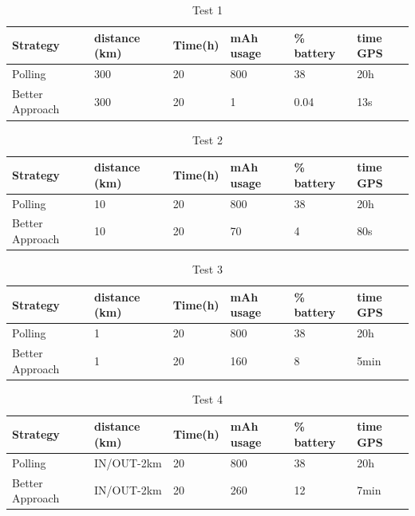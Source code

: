 \documentclass[conference]{IEEEtran}
\begin{document}
\begin{table}[h]
  \centering
    \begin{tabular}{|P{1.4cm}|P{0.8cm}|P{0.8cm}|P{0.8cm}|P{0.8cm}|P{0.8cm}|}
    \hline
    Strategy & distance (km) & Time(h) & mAh usage & \% battery & time GPS \\ \hline
    Polling & 300 & 20 & 800 & 38 & 20h   \\ \hline
    Better Approach & 300 & 20 & 1 & 0.04 & 13s   \\ \hline
   \end{tabular}
  \newline\newline
  \caption{Test 1}
\end{table}

\begin{table}[h]
  \centering
    \begin{tabular}{|P{1.4cm}|P{0.8cm}|P{0.8cm}|P{0.8cm}|P{0.8cm}|P{0.8cm}|}
    \hline
    Strategy & distance (km) & Time(h) & mAh usage & \% battery & time GPS \\ \hline
    Polling & 10 & 20 & 800 & 38 & 20h   \\ \hline
    Better Approach & 10 & 20 & 70 & 4 & 80s   \\ \hline
   \end{tabular}
  \newline\newline
  \caption{Test 2}
\end{table}

\begin{table}[h]
  \centering
    \begin{tabular}{|P{1.4cm}|P{0.8cm}|P{0.8cm}|P{0.8cm}|P{0.8cm}|P{0.8cm}|}
    \hline
    Strategy & distance (km) & Time(h) & mAh usage & \% battery & time GPS \\ \hline
    Polling & 1 & 20 & 800 & 38 & 20h   \\ \hline
    Better Approach & 1 & 20 & 160 & 8 & 5min   \\ \hline
   \end{tabular}
  \newline\newline
  \caption{Test 3}
\end{table}

\begin{table}[h]
  \centering
    \begin{tabular}{|P{1.4cm}|P{0.8cm}|P{0.8cm}|P{0.8cm}|P{0.8cm}|P{0.8cm}|}
    \hline
    Strategy & distance (km) & Time(h) & mAh usage & \% battery & time GPS \\ \hline
    Polling & IN/OUT-2km & 20 & 800 & 38 & 20h   \\ \hline
    Better Approach & IN/OUT-2km & 20 & 260 & 12 & 7min   \\ \hline
   \end{tabular}
  \newline\newline
  \caption{Test 4}
\end{table}
\end{document}
